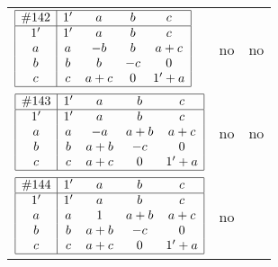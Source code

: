 \documentclass[12pt]{article}
\theoremstyle{definition}
\newcommand{\join}{\mathbin{+}}%
\newcommand{\id}{{1'}}%
\renewcommand{\top}{1}%
\begin{document}
\begin{center}
\begin{longtable}{l|c|c}
$
\begin{array}{|c|cccc|} \hline
\#142 & \id & a & b & c \\ \hline
\id & \id & a & b & c \\
a & a & -b & b & a \join c \\
b & b & b & -c & 0 \\
c & c & a \join c & 0 & \id \join a \\ \hline
\end{array}
$
 & no  
 & no      \\[15mm]

$
\begin{array}{|c|cccc|} \hline
\#143 & \id & a & b & c \\ \hline
\id & \id & a & b & c \\
a & a & -a & a \join b & a \join c \\
b & b & a \join b & -c & 0 \\
c & c & a \join c & 0 & \id \join a \\ \hline
\end{array}
$
 & no  
 & no      \\[15mm]

$
\begin{array}{|c|cccc|} \hline
\#144 & \id & a & b & c \\ \hline
\id & \id & a & b & c \\
a & a & \top & a \join b & a \join c \\
b & b & a \join b & -c & 0 \\
c & c & a \join c & 0 & \id \join a \\ \hline
\end{array}
$
 & no  
 & \adjustbox{valign=c, max height=1.6cm}{$
\left[ \begin{array}{ccccccc}
\id & a & a & b & a & a & b \\ 
a & \id & a & a & c & a & a \\ 
a & a & \id & b & a & a & b \\ 
b & a & b & \id & a & a & b \\ 
a & c & a & a & \id & c & a \\ 
a & a & a & a & c & \id & a \\ 
b & a & b & b & a & a & \id
\end{array}\right]
$}      \\[15mm]


\end{longtable}
\end{center}
\end{document}
